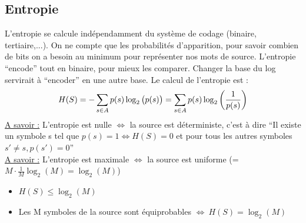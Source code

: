 \documentclass[11pt,a4paper]{article}
\begin{document}
\subsection{Entropie}
L'entropie se calcule indépendamment du système de codage (binaire, tertiaire,...). On ne compte que les probabilités d'apparition, pour savoir combien de bits on a besoin au minimum pour représenter nos mots de source.  L'entropie \enquote{encode} tout en binaire, pour mieux les comparer. Changer la base du log servirait à \enquote{encoder} en une autre base. Le calcul de l'entropie est :
\begin{equation}
	H(S) = -\sum\limits_{s\in A}^{}p(s)\log_2\big(p(s)\big) = \sum\limits_{s\in A}^{}p(s)\log_2\left(\frac{1}{p(s)}\right)
\end{equation}
\uline{A savoir :} L'entropie est nulle $\iff$ la source est déterministe, c'est à dire \enquote{Il existe un symbole s tel que $p(s) = 1 \iff H(S) = 0$ et pour tous les autres symboles $s' \neq s, p(s') = 0$}\\
\uline{A savoir :} L'entropie est maximale $\iff$ la source est uniforme (= $M\cdot \frac{1}{M}\log_2(M) = \log_2(M)$)\\
\begin{itemize}
	\item $H(S) \leq \log_2(M)$
	\item Les M symboles de la source sont équiprobables $\iff\ H(S) = \log_2(M)$
\end{itemize}
\end{document}

